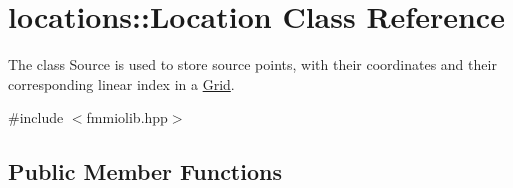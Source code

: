 \hypertarget{classlocations_1_1_location}{}\section{locations\+:\+:Location Class Reference}
\label{classlocations_1_1_location}


The class Source is used to store source points, with their coordinates and their corresponding linear index in a \hyperlink{class_grid}{Grid}.  




{\ttfamily \#include $<$fmmiolib.\+hpp$>$}

\subsection*{Public Member Functions}
